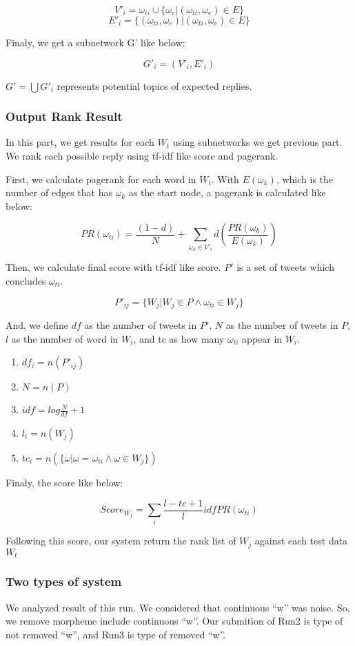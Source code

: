 \documentclass{sig-alternate}
\begin{document}
\[V'_{i} = \omega_{ti} \cup \{\omega_{e} |  (\omega_{ti}, \omega_{e}) \in E\}\]
\[E'_{i} = \{(\omega_{ti}, \omega_{e}) | (\omega_{ti}, \omega_{e}) \in E\} \]

Finaly, we get a subnetwork G' like below:

\[G'_{i} = (V'_{i}, E'_{i})\]

\(G' = \bigcup G'_{i}\) represents potential topics of expected replies.

\subsubsection{Output Rank Result}
In this part, we get results for each $W_{t}$ using subnetworks we get previous part. We rank each possible reply using tf-idf like score and pagerank.

First, we calculate pagerank for each word in $W_{t}$. With $E(\omega_{k})$, which is the number of edges that has $\omega_{k}$ as the start node, a pagerank is calculated like below:

\[PR(\omega_{ti}) = \frac{(1-d)}{N} + \sum_{\omega_{k}\in V'_{i}} d(\frac{PR(\omega_{k})}{E(\omega_{k})})\]

Then, we calculate final score with tf-idf like score. $P'$ is a set of tweets which concludes $\omega_{ti}$. 

\[P'_{ij} = \{W_{j} | W_{j} \in P \wedge \omega_{ti} \in W_{j}\}\]

And, we define $df$ as the number of tweets in $P'$, $N$ as the number of tweets in $P$, $l$ as the number of word in $W_{i}$, and tc as how many $\omega_{ti}$ appear in $W_{i}$.

\begin{enumerate}
    \item $df_{i} = n(P'_{ij})$
    \item $N = n(P)$
    \item $idf = log \frac{N}{df} + 1$
    \item $l_{i} = n(W_{j})$
    \item $tc_{i} = n(\{\omega | \omega = \omega_{ti} \wedge \omega \in W_{j}\})$
\end{enumerate}

Finaly, the score like below:

\[Score_{W_{j}} = \sum_{i} \frac{l-tc+1}{l} idf PR(\omega_{ti})\]

Following this score, our system return the rank list of $W_{j}$ against each test data $W_{t}$

\subsubsection{Two types of system}
  We analyzed result of this run. We considered that continuous ``w'' was noise. So, we remove morpheme include continuous ``w''.
  Our submition of Run2 is type of not removed ``w'', and Run3 is type of removed ``w''.




\end{document}
